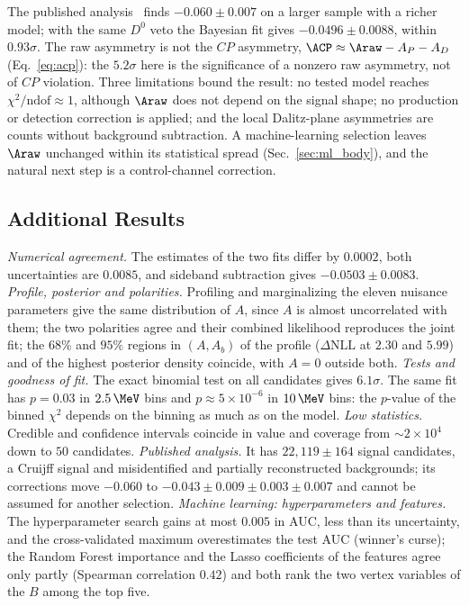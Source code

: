 \label{sec:comparison_published}
The published analysis~\cite{lhcb_cpv_2013} finds $-0.060\pm0.007$ on a larger sample with a richer model; with the same $D^0$ veto the Bayesian fit gives $-0.0496\pm0.0088$, within $0.93\sigma$. The raw asymmetry is not the $CP$ asymmetry, $\ACP\approx\Araw-A_P-A_D$ (Eq.~\eqref{eq:acp}): the $5.2\sigma$ here is the significance of a nonzero raw asymmetry, not of $CP$ violation. Three limitations bound the result: no tested model reaches $\chi^2/\mathrm{ndof}\approx1$, although $\Araw$ does not depend on the signal shape; no production or detection correction is applied; and the local Dalitz-plane asymmetries are counts without background subtraction. A machine-learning selection leaves $\Araw$ unchanged within its statistical spread (Sec.~\ref{sec:ml_body}), and the natural next step is a control-channel correction.
\subsection{Additional Results}
\emph{Numerical agreement.} The estimates of the two fits differ by $0.0002$, both uncertainties are $0.0085$, and sideband subtraction gives $-0.0503\pm0.0083$.
\emph{Profile, posterior and polarities.} Profiling and marginalizing the eleven nuisance parameters give the same distribution of $A$, since $A$ is almost uncorrelated with them; the two polarities agree and their combined likelihood reproduces the joint fit; the $68\%$ and $95\%$ regions in $(A,A_b)$ of the profile ($\Delta\mathrm{NLL}$ at $2.30$ and $5.99$) and of the highest posterior density coincide, with $A=0$ outside both.
\emph{Tests and goodness of fit.} The exact binomial test on all candidates gives $6.1\sigma$. The same fit has $p=0.03$ in $2.5\,\MeV$ bins and $p\approx5\times10^{-6}$ in $10\,\MeV$ bins: the $p$-value of the binned $\chi^2$ depends on the binning as much as on the model.
\emph{Low statistics.} Credible and confidence intervals coincide in value and coverage from $\sim2\times10^4$ down to $50$ candidates.
\emph{Published analysis.} It has $22{,}119\pm164$ signal candidates, a Cruijff signal and misidentified and partially reconstructed backgrounds; its corrections move $-0.060$ to $-0.043\pm0.009\pm0.003\pm0.007$ and cannot be assumed for another selection.
\emph{Machine learning: hyperparameters and features.} The hyperparameter search gains at most $0.005$ in AUC, less than its uncertainty, and the cross-validated maximum overestimates the test AUC (winner's curse); the Random Forest importance and the Lasso coefficients of the features agree only partly (Spearman correlation $0.42$) and both rank the two vertex variables of the $B$ among the top five.
